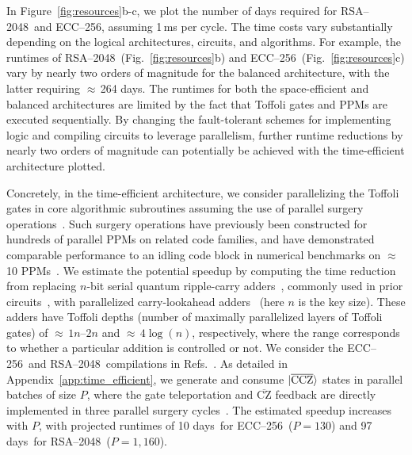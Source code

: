 \documentclass[reprint,twocolumn,secnumarabic,amssymb, aps, prx]{revtex4-2}
\newcommand{\trsatime}{97 days}
\newcommand{\teccbalanced}{264 days}
\newcommand{\tecctime}{10 days}
\newcommand{\ecc}{\mbox{ECC--256}}
\newcommand{\rsa}{\mbox{RSA--2048}}
\newcommand{\ccz}{\ket{\overline{\text{CCZ}}}}
\begin{document}
In Figure~\ref{fig:resources}b-c, we plot the number of days required for \rsa\ and \ecc, assuming 1\,ms per cycle. The time costs vary substantially depending on the logical architectures, circuits, and algorithms. For example, the runtimes of \rsa~(Fig.~\ref{fig:resources}b) and \ecc~(Fig.~\ref{fig:resources}c) vary by nearly two orders of magnitude for the balanced architecture, with the latter requiring $\approx$\,\teccbalanced. The runtimes for both the space-efficient and balanced architectures are limited by the fact that Toffoli gates and PPMs are executed sequentially. By changing the fault-tolerant schemes for implementing logic and compiling circuits to leverage parallelism, further runtime reductions by nearly two orders of magnitude can potentially be achieved with the time-efficient architecture plotted.

Concretely, in the time-efficient architecture, we consider parallelizing the Toffoli gates in core algorithmic subroutines assuming the use of parallel surgery operations~\cite{zhang2025time, cowtan2025parallel, zheng2025high}. Such surgery operations have previously been constructed for hundreds of parallel PPMs on related code families, and have demonstrated comparable performance to an idling code block in numerical benchmarks on $\approx$\,10 PPMs~\cite{zheng2025high}. We estimate the potential speedup by computing the time reduction from replacing $n$-bit serial quantum ripple-carry adders~\cite{vedral1996quantum, cuccaro2004new, gidney2018halving}, commonly used in prior circuits~\cite{gidney2019how, gidney2025how}, with parallelized carry-lookahead adders~\cite{draper2004logarithmic} (here $n$ is the key size). These adders have Toffoli depths (number of maximally parallelized layers of Toffoli gates) of \mbox{$\approx$\,$1n$--$2n$} and $\approx$\,$4\log(n)$, respectively, where the range corresponds to whether a particular addition is controlled or not. We consider the \ecc\ and \rsa\ compilations in Refs.~\cite{gidney2019how, babbush2026quantum}. As detailed in Appendix~\ref{app:time_efficient}, we generate and consume $\ccz$ states in parallel batches of size $P$, where the gate teleportation and $\overline{\text{CZ}}$ feedback are directly implemented in three parallel surgery cycles~\cite{horsman2012surface, zheng2025high}. The estimated speedup increases with $P$, with projected runtimes of \tecctime\ for \ecc\ ($P=130$) and \trsatime\ for \rsa\ ($P=1{,}160$).
\end{document}
